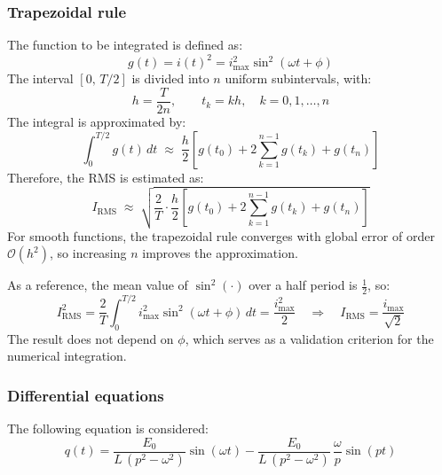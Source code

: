 \documentclass[pdflatex,sn-mathphys-num]{sn-jnl}%
\begin{document}
\subsubsection{Trapezoidal rule}
The function to be integrated is defined as:
\begin{equation}
g(t)=i(t)^{2}=i_{\max}^{2}\sin^{2}(\omega t+\phi)
\end{equation}
The interval $[0,\,T/2]$ is divided into $n$ uniform subintervals, with:
\begin{equation}
h=\frac{T}{2n},\qquad t_k=kh,\quad k=0,1,\dots,n
\end{equation}
The integral is approximated by:
\begin{equation}
\int_{0}^{T/2} g(t)\,dt\;\approx\;\frac{h}{2}\left[g(t_0)+2\sum_{k=1}^{n-1} g(t_k)+g(t_n)\right]
\end{equation}
Therefore, the RMS is estimated as:
\begin{equation}
I_{\mathrm{RMS}}\;\approx\;\sqrt{\frac{2}{T}\cdot\frac{h}{2}\left[g(t_0)+2\sum_{k=1}^{n-1} g(t_k)+g(t_n)\right]}
\end{equation}
For smooth functions, the trapezoidal rule converges with global error of order $\mathcal{O}(h^2)$, so increasing $n$ improves the approximation.

As a reference, the mean value of $\sin^2(\cdot)$ over a half period is $\tfrac{1}{2}$, so:
\begin{equation}
I_{\mathrm{RMS}}^{2}=\frac{2}{T}\int_{0}^{T/2} i_{\max}^{2}\sin^{2}(\omega t+\phi)\,dt=\frac{i_{\max}^{2}}{2}
\quad\Rightarrow\quad
I_{\mathrm{RMS}}=\frac{i_{\max}}{\sqrt{2}}
\end{equation}
The result does not depend on $\phi$, which serves as a validation criterion for the numerical integration.


\subsubsection{Differential equations}
The following equation is considered:
$$
q(t)=\frac{E_0}{L\,(p^2-\omega^2)}\sin(\omega t)-\frac{E_0}{L\,(p^2-\omega^2)}\,\frac{\omega}{p}\sin(pt)
$$
\end{document}
